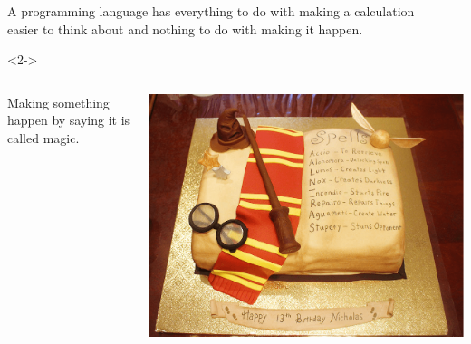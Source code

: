 \documentclass[aspectratio=169]{beamer}
\begin{document}
\begin{frame}{}
\large
\vspace{1 cm}
\begin{center}
A programming language has everything to do with making a calculation \\ easier to think about and nothing to do with making it happen.
\end{center}

\vspace{0.5 cm}
\begin{uncoverenv}<2->
\begin{columns}

\begin{center}
Making something happen by saying it is called magic.
\end{center}

\includegraphics[width=\linewidth]{Harry-Potter-Cake.png}

\end{columns}
\end{uncoverenv}
\end{frame}
\end{document}
